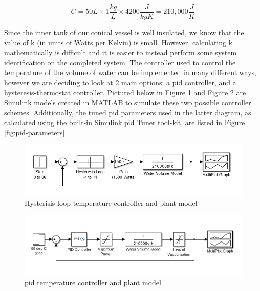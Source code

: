 \documentclass{article}
\begin{document}
\begin{equation}
C = 50L \times 1\frac{kg}{L} \times 4200\frac{J}{kgK} = 210,000\frac{J}{K}
\label{eq:value-heat}
\end{equation}

Since the inner tank of our conical vessel is well insulated, we know that the value of k (in units of Watts per Kelvin) is small. However, calculating k mathematically is difficult and it is easier to instead perform some system identification on the completed system.
The controller used to control the temperature of the volume of water can be implemented in many different ways, however we are deciding to look at 2 main options: a \gls{pid} controller, and a hysteresis-thermostat controller. Pictured below in Figure \ref{fig:hysteresis-block-diagram} and Figure \ref{fig:pid-block-diagram} are Simulink models created in MATLAB to simulate these two possible controller schemes. Additionally, the tuned \gls{pid} parameters used in the latter diagram, as calculated using the built-in Simulink \gls{pid} Tuner tool-kit, are listed in Figure \ref{fig:pid-parameters}.

\begin{figure}[H]
\begin{center}
\includegraphics[scale=0.50]{hysteresis-block-diagram.png}
\caption{Hysterisis loop temperature controller and plant model}
\label{fig:hysteresis-block-diagram}
\end{center}
\end{figure}

\begin{figure}[H]
\begin{center}
\includegraphics[scale=0.50]{pid-block-diagram.png}
\caption{\gls{pid} temperature controller and plant model}
\label{fig:pid-block-diagram}
\end{center}
\end{figure}
\end{document}
